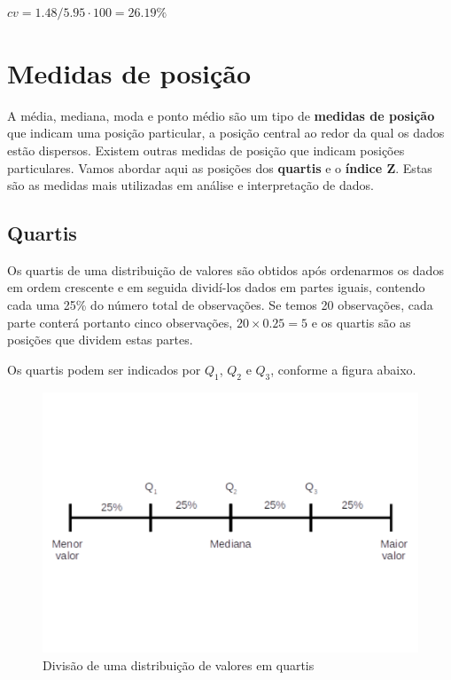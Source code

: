 \documentclass[
]{book}
\begin{document}
\(cv = 1.48/5.95 \cdot 100 = 26.19\%\)

\hypertarget{medidas-de-posiuxe7uxe3o}{%
\section{Medidas de posição}\label{medidas-de-posiuxe7uxe3o}}

A média, mediana, moda e ponto médio são um tipo de \textbf{medidas de posição} que indicam uma posição particular, a posição central ao redor da qual os dados estão dispersos. Existem outras medidas de posição que indicam posições particulares. Vamos abordar aqui as posições dos \textbf{quartis} e o \textbf{índice Z}. Estas são as medidas mais utilizadas em análise e interpretação de dados.

\hypertarget{quartis}{%
\subsection{Quartis}\label{quartis}}

Os quartis de uma distribuição de valores são obtidos após ordenarmos os dados em ordem crescente e em seguida dividí-los dados em partes iguais, contendo cada uma 25\% do número total de observações. Se temos 20 observações, cada parte conterá portanto cinco observações, \(20 \times 0.25 = 5\) e os quartis são as posições que dividem estas partes.

Os quartis podem ser indicados por \(Q_1\), \(Q_2\) e \(Q_3\), conforme a figura abaixo.

\begin{figure}

{\centering \includegraphics{probest-cambientais_files/figure-latex/quartisfig-1} 

}

\caption{Divisão de uma distribuição de valores em quartis}\label{fig:quartisfig}
\end{figure}
\end{document}
